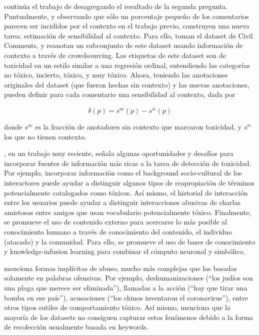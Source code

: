 \citet{xenos-2021-context} continúa el trabajo de \citet{pavlopoulos2020toxicity} desagregando el resultado de la segunda pregunta. Puntualmente, y observando que sólo un porcentaje pequeño de los comentarios parecen ser incididos por el contexto en el trabajo previo, construyen una nueva tarea: estimación de sensibilidad al contexto. Para ello, toman el dataset de Civil Comments\cite{borkan2019civil}, y reanotan un subconjunto de este dataset usando información de contexto a través de crowdsourcing. Las etiquetas de este dataset son de toxicidad en un estilo similar a una regresión ordinal, entendiendo las categorías no tóxico, incierto, tóxico, y muy tóxico. Ahora, teniendo las anotaciones originales del dataset (que fueron hechas sin contexto) y las nuevas anotaciones, pueden definir para cada comentario una sensibilidad al contexto, dada por

\begin{equation}
    \delta(p) = s^{oc}(p) - s^{ic}(p)
\end{equation}

donde $s^{oc}$ es la fracción de anotadores sin contexto que marcaron toxicidad, y $s^{ic}$ los que no tienen contexto.

\citet{sheth2021defining}, en un trabajo muy reciente, señala algunas oportunidades y desafíos  para incorporar fuentes de información más ricas a la tarea de detección de toxicidad. Por ejemplo, incorporar información como el background socio-cultural de los interactores puede ayudar a distinguir algunos tipos de reapropiación de términos potencialmente catalogados como tóxicos. Así mismo, el historial de interacción entre los usuarios puede ayudar a distinguir interacciones abusivas de charlas amistosas entre amigos que usan vocabulario potencialmente tóxico. Finalmente, se promueve el uso de contenido externo para acercarse lo más posible al conocimiento humano a través de conocimiento del contenido, el individuo (atacado) y la comunidad. Para ello, se promueve el uso de bases de conocimiento y knowledge-infusion learning \cite{gaur2020infusion} para combinar el cómputo neuronal y simbólico.



\citet{wiegand2021implicitly} menciona formas implícitas de abuso, mucho más complejas que las basadas solamente en palabras ofensivas. Por ejemplo, deshumanizaciones (``los judíos son una plaga que merece ser eliminada''), llamadas a la acción (``hay que tirar una bomba en ese país''), acusaciones (``los chinos inventaron el coronavirus''), entre otros tipos sutiles de comportamiento tóxico. Así mismo, menciona que la mayoría de los datasets no consiguen capturar estos fenómenos debido a la forma de recolección usualmente basada en keywords.

